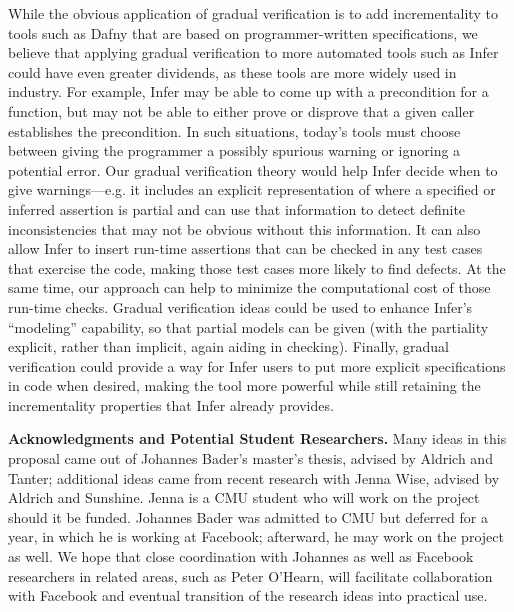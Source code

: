 \documentclass[10pt,twocolumn]{article}
\newcommand{\minisec}[1]{\vspace{2ex}\noindent\textbf{#1}}
\begin{document}
\begin{sloppypar}
While the obvious application of gradual verification is to add incrementality to tools such as Dafny that are based on programmer-written specifications, we believe that applying gradual verification to more automated tools such as Infer could have even greater dividends, as these tools are more widely used in industry.  For example, Infer may be able to come up with a precondition for a function, but may not be able to either prove or disprove that a given caller establishes the precondition.  In such situations, today's tools must choose between giving the programmer a possibly spurious warning or ignoring a potential error.  Our gradual verification theory would help Infer decide when to give warnings---e.g. it includes an explicit representation of where a specified or inferred assertion is partial and can use that information to detect definite inconsistencies that may not be obvious without this information.  It can also allow Infer to insert run-time assertions that can be checked in any test cases that exercise the code, making those test cases more likely to find defects.  At the same time, our approach can help to minimize the computational cost of those run-time checks.  Gradual verification ideas could be used to enhance Infer's ``modeling'' capability, so that partial models can be given (with the partiality explicit, rather than implicit, again aiding in checking).  Finally, gradual verification could provide a way for Infer users to put more explicit specifications in code when desired, making the tool more powerful while still retaining the incrementality properties that Infer already provides.


\minisec{Acknowledgments and Potential Student Researchers.}  Many ideas in this proposal came out of Johannes Bader's master's thesis, advised by Aldrich and Tanter; additional ideas came from recent research with Jenna Wise, advised by Aldrich and Sunshine.  Jenna is a CMU student who will work on the project should it be funded.  Johannes Bader was admitted to CMU but deferred for a year, in which he is working at Facebook; afterward, he may work on the project as well.  We hope that close coordination with Johannes as well as Facebook researchers in related areas, such as Peter O'Hearn, will facilitate collaboration with Facebook and eventual transition of the research ideas into practical use.




\end{sloppypar}
\end{document}
